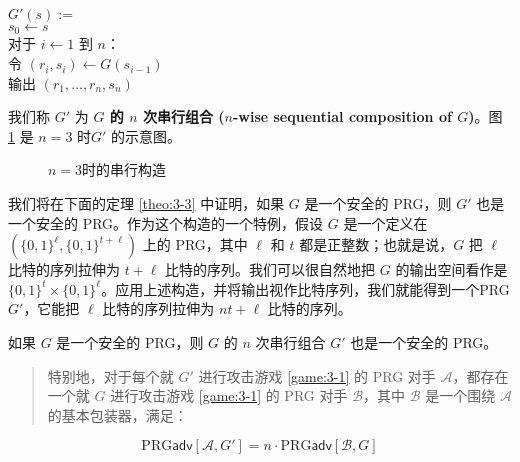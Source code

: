 \hspace*{5pt} $G'(s):=$\\
\hspace*{50pt} $s_0\leftarrow s$\\
\hspace*{50pt} 对于 $i\leftarrow1$ 到 $n$：\\
\hspace*{75pt} 令 $(r_i,s_i)\leftarrow G(s_{i-1})$\\
\hspace*{50pt} 输出 $(r_1,\dots,r_n,s_n)$

\vspace*{10pt}

\noindent
我们称 $G'$ 为 \textbf{$G$ 的 $n$ 次串行组合 ($n$-wise sequential composition of $G$)}。图 \ref{fig:3-6} 是 $n=3$ 时$G'$ 的示意图。

\begin{figure}
	\centering
	
	\caption{$n=3$时的串行构造}
	\label{fig:3-6}
\end{figure}

我们将在下面的定理 \ref{theo:3-3} 中证明，如果 $G$ 是一个安全的 PRG，则 $G'$ 也是一个安全的 PRG。作为这个构造的一个特例，假设 $G$ 是一个定义在 $(\{0,1\}^\ell,\{0,1\}^{t+\ell})$ 上的 PRG，其中 $\ell$ 和 $t$ 都是正整数；也就是说，$G$ 把 $\ell$ 比特的序列拉伸为 $t+\ell$ 比特的序列。我们可以很自然地把 $G$ 的输出空间看作是 $\{0,1\}^t\times\{0,1\}^\ell$。应用上述构造，并将输出视作比特序列，我们就能得到一个PRG $G'$，它能把 $\ell$ 比特的序列拉伸为 $nt+\ell$ 比特的序列。

\begin{theorem}\label{theo:3-3}
如果 $G$ 是一个安全的 PRG，则 $G$ 的 $n$ 次串行组合 $G'$ 也是一个安全的 PRG。
\begin{quote}
特别地，对于每个就 $G'$ 进行攻击游戏 \ref{game:3-1} 的 PRG 对手 $\mathcal A$，都存在一个就 $G$ 进行攻击游戏 \ref{game:3-1} 的 PRG 对手 $\mathcal B$，其中 $\mathcal B$ 是一个围绕 $\mathcal A$ 的基本包装器，满足：
\end{quote}
\[
\mathrm{PRG}\mathsf{adv}[\mathcal{A},G']
=n\cdot
\mathrm{PRG}\mathsf{adv}[\mathcal{B},G]
\]
\end{theorem}

